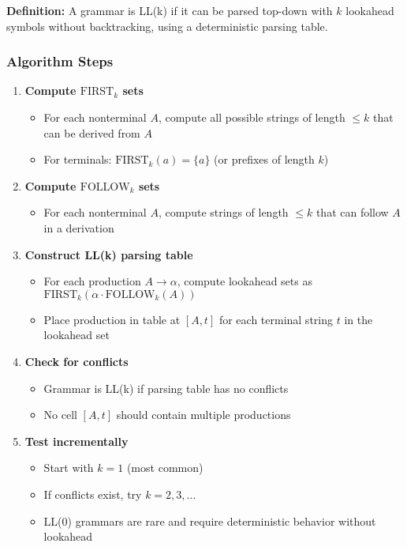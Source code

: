 \textbf{Definition:} A grammar is LL(k) if it can be parsed top-down with $k$ lookahead symbols without backtracking, using a deterministic parsing table.

\subsubsection{Algorithm Steps}

\begin{enumerate}
    \item \textbf{Compute $\text{FIRST}_k$ sets}
    \begin{itemize}
        \item For each nonterminal $A$, compute all possible strings of length $\leq k$ that can be derived from $A$
        \item For terminals: $\text{FIRST}_k(a) = \{a\}$ (or prefixes of length $k$)
    \end{itemize}
    
    \item \textbf{Compute $\text{FOLLOW}_k$ sets}
    \begin{itemize}
        \item For each nonterminal $A$, compute strings of length $\leq k$ that can follow $A$ in a derivation
    \end{itemize}
    
    \item \textbf{Construct LL(k) parsing table}
    \begin{itemize}
        \item For each production $A \to \alpha$, compute lookahead sets as $\text{FIRST}_k(\alpha \cdot \text{FOLLOW}_k(A))$
        \item Place production in table at $[A, t]$ for each terminal string $t$ in the lookahead set
    \end{itemize}
    
    \item \textbf{Check for conflicts}
    \begin{itemize}
        \item Grammar is LL(k) if parsing table has no conflicts
        \item No cell $[A, t]$ should contain multiple productions
    \end{itemize}
    
    \item \textbf{Test incrementally}
    \begin{itemize}
        \item Start with $k = 1$ (most common)
        \item If conflicts exist, try $k = 2, 3, \ldots$
        \item LL(0) grammars are rare and require deterministic behavior without lookahead
    \end{itemize}
\end{enumerate}

